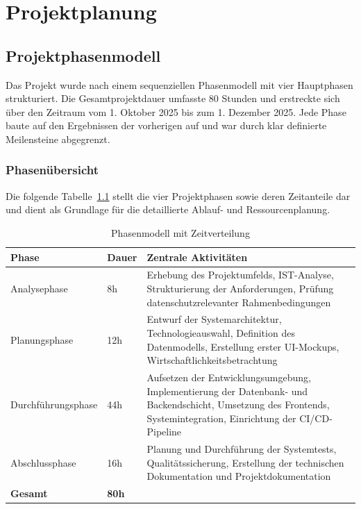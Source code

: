 \chapter{Projektplanung}

\section{Projektphasenmodell}

Das Projekt wurde nach einem sequenziellen Phasenmodell mit vier Hauptphasen strukturiert. 
Die Gesamtprojektdauer umfasste 80 Stunden und erstreckte sich über den Zeitraum vom 
1. Oktober 2025 bis zum 1. Dezember 2025. Jede Phase baute auf den Ergebnissen der vorherigen 
auf und war durch klar definierte Meilensteine abgegrenzt.

\subsection{Phasenübersicht}

Die folgende Tabelle~\ref{tab:phasenmodell} stellt die vier Projektphasen sowie deren Zeitanteile dar und dient als Grundlage für die detaillierte Ablauf- und Ressourcenplanung.

\begin{table}[H]
\centering
\footnotesize
{}
\begin{tabularx}{\textwidth}{|p{3cm}|p{1.5cm}|X|}
\hline
\rowcolor{EDAGDunkelgrau!10}
\textbf{Phase} & \textbf{Dauer} & \textbf{Zentrale Aktivitäten} \\
\hline
Analysephase & 8h &
Erhebung des Projektumfelds, IST-Analyse, Strukturierung der Anforderungen, Prüfung datenschutzrelevanter Rahmenbedingungen \\
\hline
Planungsphase & 12h &
Entwurf der Systemarchitektur, Technologieauswahl, Definition des Datenmodells, Erstellung erster UI-Mockups, Wirtschaftlichkeitsbetrachtung \\
\hline
Durchführungsphase & 44h &
Aufsetzen der Entwicklungsumgebung, Implementierung der Datenbank- und Backendschicht, Umsetzung des Frontends, Systemintegration, Einrichtung der CI/CD-Pipeline \\
\hline
Abschlussphase & 16h &
Planung und Durchführung der Systemtests, Qualitätssicherung, Erstellung der technischen Dokumentation und Projektdokumentation \\
\hline
\rowcolor{EDAGDunkelgrau!30}
\textbf{Gesamt} & \textbf{80h} & \\
\hline
\end{tabularx}
\caption{Phasenmodell mit Zeitverteilung}
\label{tab:phasenmodell}
\end{table}

